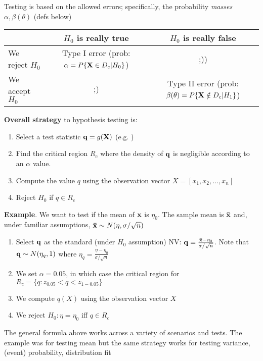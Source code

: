 \documentclass[a4paper, oneside]{book}
\begin{document}
Testing is based on the allowed errors; specifically, the probability \textit{masses} $\alpha, \beta(\theta)$ (defs below) 
\begin{table}[h!]
\centering
\begin{tabular}{|l | c | c|} \hline
				& $H_0$ is really true 			& $H_0$ is really false \\ \hline	
We reject $H_0$	& Type I error (prob: $\alpha = P\{ \mathbf{X} \in D_c | H_0 \}$) & ;)) \\\hline
We accept $H_0$	& ;) & Type II error (prob: $\beta(\theta) = P\{ \mathbf{X} \notin D_c | H_1 \}$)  \\\hline
\end{tabular} 
\end{table}

\noindent \textbf{Overall strategy} to hypothesis testing is: 
\begin{enumerate}
\setlength\itemsep{0.05em}
\item Select a test statistic $\mathbf{q} = g(\mathbf{X})$ (e.g. )
\item Find the critical region $R_c$ where the density of $\mathbf{q}$ is negligible according to an $\alpha$ value.
\item Compute the value $q$ using the observation vector $X=[x_1,x_2,\hdots,x_n]$
\item Reject $H_0$ if $q \in R_c$ 
\end{enumerate}

\noindent \textbf{Example}. We want to test if the mean of $\mathbf{x}$ is $\eta_0$. The sample mean is $\mathbf{\bar{x}}$ and, under familiar assumptions, $\mathbf{\bar{x}}\sim N(\eta, \sigma/\sqrt{n})$
\begin{enumerate}
\setlength\itemsep{0.05em}
\item Select $\mathbf{q}$ as the standard (under $H_0$ assumption) NV: $\mathbf{q}=\frac{\mathbf{\bar{x}}-\eta_0}{\sigma/\sqrt{n}}$. Note that $\mathbf{q}\sim N(\eta_q, 1)$ where $\eta_q=\frac{\eta-\eta_0}{\sigma/\sqrt{n}}$
\item We set $\alpha=0.05$, in which case the critical region for $R_c = \{q : z_{0.05} < q < z_{1-0.05}\}$
\item We compute $q(X)$ using the observation vector $X$
\item We reject $H_0:\eta=\eta_0$ iff $q\in R_c$
\end{enumerate}

\noindent The general formula above works across a variety of scenarios and tests. The example was for testing mean but the same strategy works for testing variance, (event) probability, distribution fit
\end{document}
